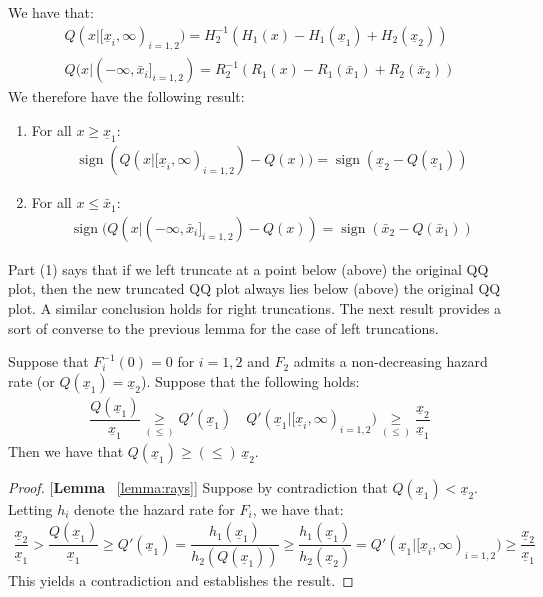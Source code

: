 \begin{lemma}\label{lemma:relativeposition}
We have that:
\begin{gather*}
    Q(x|[\underline{x}_i,\infty)_{i=1,2}) = H_2^{-1}(H_1(x) - H_1(\underline{x}_1) + H_2(\underline{x}_2)) \\ 
    Q(x|(-\infty,\bar{x}_i]_{i=1,2}) = R_2^{-1}(R_1(x) - R_1(\bar{x}_1) + R_2(\bar{x}_2)) 
\end{gather*}
We therefore have the following result:
\vspace{-5pt}
\begin{enumerate}[label=(\arabic*),ref=\thelemma(\arabic*)]
   \item For all $x\geq \underline{x}_1$:
    \begin{align*}
        \operatorname{sign}(Q(x|[\underline{x}_i,\infty)_{i=1,2})- Q(x)) = \operatorname{sign}(\underline{x}_2 - Q(\underline{x}_1))
    \end{align*}
    \item For all $x\leq \bar{x}_1$:
    \begin{align*}
        \operatorname{sign}(Q(x|(-\infty,\bar{x}_i]_{i=1,2}) - Q(x)) = \operatorname{sign}(\bar{x}_2 - Q(\bar{x}_1))
    \end{align*}
\end{enumerate}
\end{lemma}

\noindent Part (1) says that if we left truncate at a point below (above) the original QQ plot, then the new truncated QQ plot always lies below (above) the original QQ plot. A similar conclusion holds for right truncations. The next result provides a sort of converse to the previous lemma for the case of left truncations. 

\begin{lemma}\label{lemma:rays}
Suppose that $F_{i}^{-1}(0) = 0$ for $i=1,2$ and $F_2$ admits a non-decreasing hazard rate (or $Q(\underline{x}_1) = \underline{x}_2$). Suppose that the following holds:
\begin{align*}
    \dfrac{Q(\underline{x}_1)}{\underline{x}_1} \underset{(\leq)}{\geq} Q'(\underline{x}_1) \quad Q'(\underline{x}_1|[\underline{x}_i,\infty)_{i=1,2}) \underset{(\leq)}{\geq} \dfrac{\underline{x}_2}{\underline{x}_1}
\end{align*}
Then we have that $Q(\underline{x}_1) \geq (\leq) \,\underline{x}_2$. 
\end{lemma}

\begin{proof}{[\textbf{Lemma} ~\ref{lemma:rays}]} Suppose by contradiction that $Q(\underline{x}_1)<\underline{x}_2$. Letting $h_i$ denote the hazard rate for $F_i$, we have that:
\begin{align*}
    \dfrac{\underline{x}_2}{\underline{x}_1} > \dfrac{Q(\underline{x}_1)}{\underline{x}_1} \geq Q'(\underline{x}_1) = \dfrac{h_1(\underline{x}_1)}{h_2(Q(\underline{x}_1))}\geq \dfrac{h_1(\underline{x}_1)}{h_2(\underline{x}_2)} =Q'(\underline{x}_1|[\underline{x}_i,\infty)_{i=1,2}) \geq \dfrac{\underline{x}_2}{\underline{x}_1}
\end{align*}
This yields a contradiction and establishes the result. 
\end{proof}

